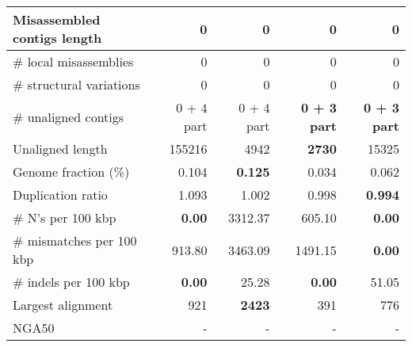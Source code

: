 \documentclass[12pt,a4paper]{article}
\begin{document}
\begin{table}[ht]
\begin{center}
\begin{tabular}{|l*{4}{|r}|}
Misassembled contigs length & 0 & 0 & 0 & 0 \\ \hline
\# local misassemblies & 0 & 0 & 0 & 0 \\ \hline
\# structural variations & 0 & 0 & 0 & 0 \\ \hline
\# unaligned contigs & 0 + 4 part & 0 + 4 part & {\bf 0 + 3 part} & {\bf 0 + 3 part} \\ \hline
Unaligned length & 155216 & 4942 & {\bf 2730} & 15325 \\ \hline
Genome fraction (\%) & 0.104 & {\bf 0.125} & 0.034 & 0.062 \\ \hline
Duplication ratio & 1.093 & 1.002 & 0.998 & {\bf 0.994} \\ \hline
\# N's per 100 kbp & {\bf 0.00} & 3312.37 & 605.10 & {\bf 0.00} \\ \hline
\# mismatches per 100 kbp & 913.80 & 3463.09 & 1491.15 & {\bf 0.00} \\ \hline
\# indels per 100 kbp & {\bf 0.00} & 25.28 & {\bf 0.00} & 51.05 \\ \hline
Largest alignment & 921 & {\bf 2423} & 391 & 776 \\ \hline
NGA50 & - & - & - & - \\ \hline
\end{tabular}
\end{center}
\end{table}
\end{document}
